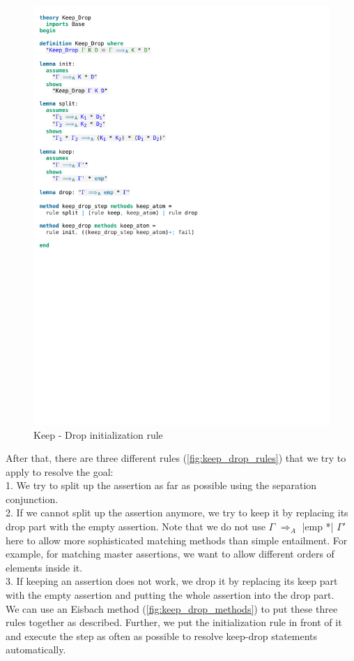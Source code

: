 \begin{figure}[htpb]
    \includegraphics[trim={0 23,4cm 0 3,8cm}, clip, width=1.00\textwidth]{figures/Theory_Keep_Drop.pdf}
    \caption[Keep-Drop initialization rule]{Keep - Drop initialization rule}
    \label{fig:keep_drop_init}
\end{figure}

\noindent After that, there are three different rules (\autoref{fig:keep_drop_rules}) that we try to apply to resolve the goal:\\
1. We try to split up the assertion as far as possible using the separation conjunction.\\
2. If we cannot split up the assertion anymore, we try to keep it by replacing its drop part with the empty assertion. Note that we do not use $\Gamma$ $\Longrightarrow_A$ |emp *| $\Gamma'$ here to allow more sophisticated matching methods than simple entailment. For example, for matching master assertions, we want to allow different orders of elements inside it.\\
3. If keeping an assertion does not work, we drop it by replacing its keep part with the empty assertion and putting the whole assertion into the drop part.\\
We can use an Eisbach method (\autoref{fig:keep_drop_methods}) to put these three rules together as described. Further, we put the initialization rule in front of it and execute the step as often as possible to resolve keep-drop statements automatically.

